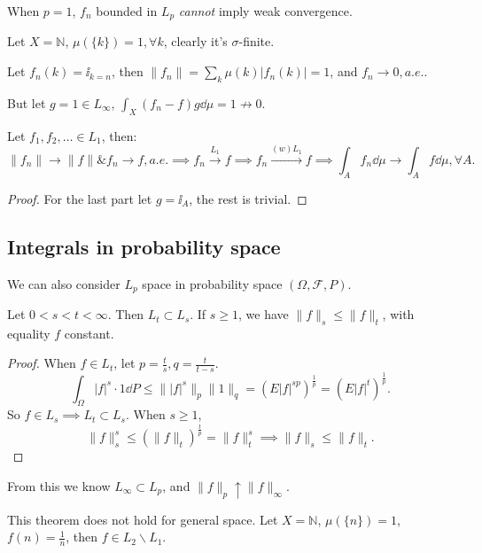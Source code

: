 When $p = 1$, $f_n$ bounded in $L_p$ \textit{cannot} imply weak convergence.
\begin{example}
    Let $X = \mathbb{N}$, $\mu(\{k\}) = 1, \forall k$,
	clearly it's $\sigma$-finite.

	Let $f_n(k) = \ii_{k=n}$, then $ \lVert f_n \rVert = \sum_k \mu(k)|f_n(k)| = 1$,
	and $f_n \to 0, a.e.$.

	But let $g = 1\in L_\infty$, $\int_X (f_n - f)g\dd \mu = 1\not \to 0$.
\end{example}
\begin{proposition}
	Let $f_1,f_2,\dots\in L_1$, then:
	\[
		\lVert f_n \rVert \to \lVert f \rVert \& f_n\to f, a.e.
		\implies f_n\xrightarrow{L_1} f \implies f_n\xrightarrow{(w)L_1}f
		\implies \int_A f_n\dd \mu \to \int_A f\dd \mu, \forall A.
	\]
\end{proposition}
\begin{proof}[Proof]
    For the last part let $g = \ii_A$, the rest is trivial.
\end{proof}

\subsection{Integrals in probability space}
\label{sub:Integrals in probability space}

We can also consider $L_p$ space in probability space  $(\Omega, \mathscr{F}, P)$.
\begin{theorem}
    Let $0<s<t<\infty$. Then $L_t \subset L_s$.
	If $s\ge 1$, we have $ \lVert f \rVert _s \le \lVert f \rVert _t$,
	with equality $f$ constant.
\end{theorem}
\begin{proof}[Proof]
    When $f\in L_t$, let $p = \frac{t}{s}, q = \frac{t}{t-s}$.
	\[
	\int_\Omega |f|^s \cdot 1\dd P \le \lVert |f|^s \rVert _p \lVert 1 \rVert _q
	= (E|f|^{sp})^{\frac{1}{p}} = (E|f|^t)^{\frac{1}{p}}.
	\]
	So $f\in L_s\implies L_t \subset L_s$.
	When $s\ge 1$,
	\[
	\lVert f \rVert _s^s\le (\lVert f \rVert _t)^{\frac{t}{p}}
	= \lVert f \rVert _t^s \implies \lVert f \rVert _s\le \lVert f \rVert _t.
	\]
\end{proof}

From this we know $L_\infty \subset L_p$,
and $ \lVert f \rVert _p \uparrow \lVert f \rVert _\infty$.

\begin{remark}
    This theorem does not hold for general space.
	Let $X = \mathbb{N}$, $\mu(\{n\}) = 1$, $f(n) = \frac{1}{n}$,
	then $f\in L_2\backslash L_1$.
\end{remark}

